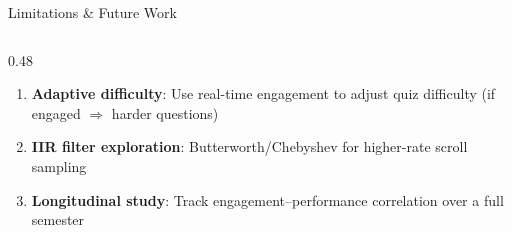 \documentclass[aspectratio=169,10pt]{beamer}
\begin{document}
\begin{frame}{Limitations \& Future Work}
\begin{columns}[T]
\begin{column}{0.48\textwidth}
\begin{enumerate}
  \item \textbf{Adaptive difficulty}: Use real-time engagement to adjust quiz difficulty (if engaged $\Rightarrow$ harder questions)

  \item \textbf{IIR filter exploration}: Butterworth/Chebyshev for higher-rate scroll sampling

  \item \textbf{Longitudinal study}: Track engagement--performance correlation over a full semester
\end{enumerate}
\end{column}
\end{columns}
\end{frame}

\end{document}
